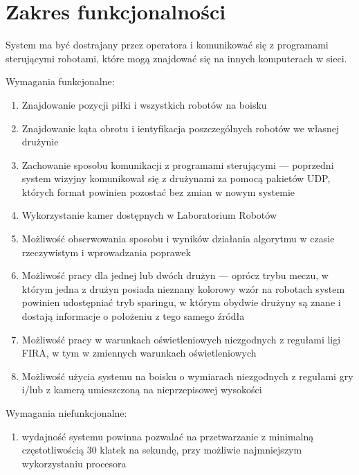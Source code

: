 \documentclass[polish,12pt]{aghthesis}
\begin{document}
\section{Zakres funkcjonalności}
\label{sec:zakres-funkcjonalnosci}
% 

System ma być dostrajany przez operatora i komunikować się z programami
sterującymi robotami, które mogą znajdować się na innych 
komputerach w sieci.

Wymagania funkcjonalne:
\begin{enumerate}
\item Znajdowanie pozycji piłki i wszystkich robotów na boisku
\item Znajdowanie kąta obrotu i ientyfikacja poszczególnych robotów
we własnej drużynie
\item Zachowanie sposobu komunikacji z programami sterującymi --- poprzedni
system wizyjny komunikował się z drużynami za pomocą pakietów UDP, których
format powinien pozostać bez zmian w nowym systemie
\item Wykorzystanie kamer dostępnych w Laboratorium Robotów
\item Możliwość obserwowania sposobu i wyników działania algorytmu w czasie
rzeczywistym i wprowadzania poprawek
\item Możliwość pracy dla jednej lub dwóch drużyn --- oprócz trybu meczu, w
którym jedna z drużyn posiada nieznany kolorowy wzór na robotach system powinien
udostępniać tryb sparingu, w którym obydwie drużyny są znane i dostają 
informacje o położeniu z tego samego źródła
\item Możliwość pracy w warunkach oświetleniowych niezgodnych z regułami ligi
FIRA, w tym w zmiennych warunkach oświetleniowych
\item Możliwość użycia systemu na boisku o wymiarach niezgodnych z regułami gry
i/lub z kamerą umieszczoną na nieprzepisowej wysokości
\end{enumerate}

Wymagania niefunkcjonalne:
\begin{enumerate}
\item wydajność systemu powinna pozwalać na przetwarzanie z minimalną
częstotliwością 30 klatek na sekundę, przy możliwie najmniejszym wykorzystaniu
procesora
\end{enumerate}
\end{document}
